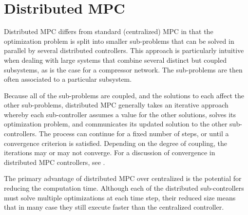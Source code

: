 \section{Distributed MPC}
\label{sec:intro:mpc}

Distributed MPC differs from standard (centralized) MPC in that the optimization problem is split into smaller sub-problems that can be solved in parallel by several distributed controllers.
This approach is particularly intuitive when dealing with large systems that combine several distinct but coupled subsystems, as is the case for a compressor network.
The sub-problems are then often associated to a particular subsystem.

Because all of the sub-problems are coupled, and the solutions to each affect the other sub-problems, distributed MPC generally takes an iterative approach whereby each sub-controller assumes a value for the other solutions, solves its optimization problem, and communicates its updated solution to the other sub-controllers.
The process can continue for a fixed number of steps, or until a convergence criterion is satisfied.
Depending on the degree of coupling, the iterations may or may not converge. For a discussion of convergence in distributed MPC controllers, see \cite{***}.

The primary advantage of distributed MPC over centralized is the potential for reducing the computation time.
Although each of the distributed sub-controllers must solve multiple optimizations at each time step, their reduced size means that in many case they still execute faster than the centralized controller.


